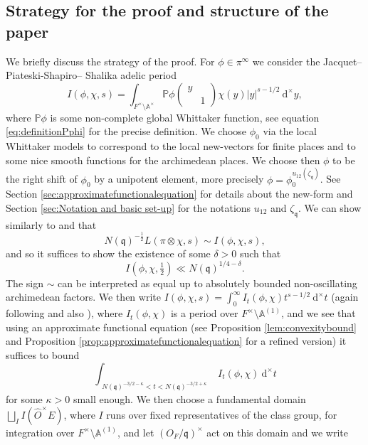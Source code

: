 \documentclass[a4paper,11pt]{amsart}
\theoremstyle{definition}
\newcommand{\A}{\mathbb{A}}
\begin{document}
\subsection{Strategy for the proof and structure of the paper} 
We briefly discuss the strategy of the proof.
For $\phi \in \pi^{\infty}$ we consider the Jacquet-- Piateski-Shapiro-- Shalika adelic period $$ I(\phi,\chi,s) = \int_{F^\times\setminus \A^\times}\mathbb{P}\phi\begin{pmatrix}
    y&\\&1
\end{pmatrix}\chi(y)\vert y \vert ^{s-1/2}\ \mathrm{d}^\times y,$$
where $\mathbb{P}\phi$ is some non-complete global Whittaker function, see equation \eqref{eq:definitionPphi} for the precise definition. We choose $\phi_0$ via the local Whittaker models to correspond to the local new-vectors for finite places and to some nice smooth functions for the archimedean places. We choose then $\phi$ to be the right shift of $\phi_0$ by a unipotent element, more precisely $\phi = \phi_0^{u_{12}(\zeta_\mathfrak{q})}$. See Section \ref{sec:approximatefunctionalequation} for details about the new-form and Section \ref{sec:Notation and basic set-up} for the notations $u_{12}$ and $\zeta_\mathfrak{q}$. We can show similarly to \cite{sparse-equidistribution-venkatesh} and \cite{michelvenkatesh} that 
\[N(\mathfrak{q})^{-\frac{1}{2}}L(\pi \otimes \chi,s) \sim I(\phi,\chi,s),\]
and so it suffices to show the existence of some $\delta>0$ such that
\[ I(\phi,\chi,\tfrac{1}{2}) \ll N(\mathfrak{q})^{1/4-\delta}.\]
The sign $\sim$ can be interpreted as equal up to absolutely bounded non-oscillating archimedean factors.
We then write $I(\phi,\chi,s) = \int_{0}^\infty I_t(\phi,\chi)t^{s-1/2}\ \mathrm{d}^\times t$ (again following \cite{sparse-equidistribution-venkatesh} and also \cite{MR4370537}), where $I_t(\phi,\chi)$ is a period over $F^{\times}\setminus\A^{(1)}$, and we see that using an approximate functional equation (see Proposition \ref{lem:convexitybound} and Proposition \ref{prop:approximatefunctionalequation} for a refined version) it suffices to bound 
\[\int_{\substack{ N(\mathfrak{q})^{-3/2-\kappa}<t<N(\mathfrak{q})^{-3/2+\kappa}}}I_{t}(\phi,\chi) \ \mathrm{d}^{\times}t\]
for some $\kappa >0$ small enough. 
We then choose a fundamental domain $\bigsqcup_{I}I(\widehat O^\times E)$, where $I$ runs over fixed representatives of the class group, for integration over $F^{\times}\setminus \A^{(1)}$, and let $(O_F/\mathfrak{q})^\times$ act on this domain and we write
\end{document}
